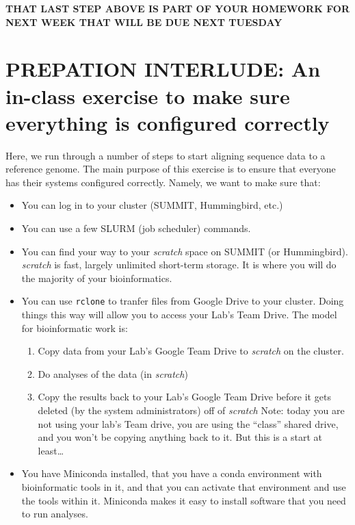 \documentclass[]{krantz}
\providecommand{\tightlist}{%
  \setlength{\itemsep}{0pt}\setlength{\parskip}{0pt}}
\begin{document}
\textbf{THAT LAST STEP ABOVE IS PART OF YOUR HOMEWORK FOR NEXT WEEK THAT WILL BE DUE NEXT TUESDAY }

\hypertarget{prepation-interlude-an-in-class-exercise-to-make-sure-everything-is-configured-correctly}{%
\section{PREPATION INTERLUDE: An in-class exercise to make sure everything is configured correctly}\label{prepation-interlude-an-in-class-exercise-to-make-sure-everything-is-configured-correctly}}

Here, we run through a number of steps to start aligning sequence data to a reference
genome. The main purpose of this exercise is to ensure that everyone has their systems
configured correctly. Namely, we want to make sure that:

\begin{itemize}
\tightlist
\item
  You can log in to your cluster (SUMMIT, Hummingbird, etc.)
\item
  You can use a few SLURM (job scheduler) commands.
\item
  You can find your way to your \emph{scratch} space on SUMMIT (or Hummingbird). \emph{scratch} is fast, largely
  unlimited short-term storage. It is where you will do the majority of your bioinformatics.
\item
  You can use \texttt{rclone} to tranfer files from Google Drive to your cluster. Doing things this way will allow
  you to access your Lab's Team Drive. The model for bioinformatic work is:

  \begin{enumerate}
  \def\labelenumi{\alph{enumi}.}
  \tightlist
  \item
    Copy data from your Lab's Google Team Drive to \emph{scratch} on the cluster.
  \item
    Do analyses of the data (in \emph{scratch})
  \item
    Copy the results back to your Lab's Google Team Drive before it gets deleted (by the system administrators)
    off of \emph{scratch}
    Note: today you are not using your lab's Team drive, you are using the ``class'' shared drive,
    and you won't be copying anything back to it. But this is a start at least\ldots{}
  \end{enumerate}
\item
  You have Miniconda installed, that you have a conda environment with bioinformatic
  tools in it, and that you can activate that environment and use the tools within it.
  Miniconda makes it easy to install software that you need to run analyses.
\end{itemize}
\end{document}
